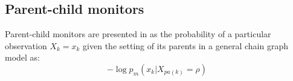 \documentclass[12pt]{article}
\begin{document}
%
%

%
% 
%


\subsection{Parent-child monitors}

%
Parent-child monitors are presented in \cite{diagnostics} as the probability of a particular observation $X_k = x_k$ given the setting of its parents in a general chain graph model as:
\begin{equation}
-\log p_m (x_k | X_{pa(k)}=\rho)
\end{equation}


\end{document}
